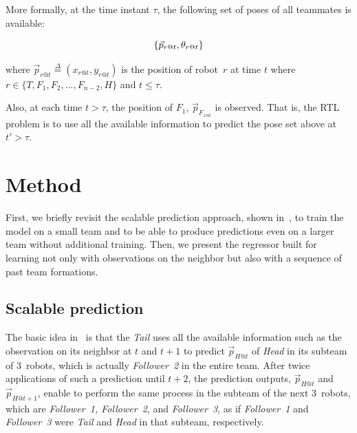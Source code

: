 \documentclass[letterpaper, 10 pt, conference]{ieeeconf}  %
\begin{document}
	More formally, at the time instant $\tau$, the following set of poses of all teammates is
	available:

	\begin{equation*}
		\{\vec{p}_{r@t},\theta_{r@t}\} \\
	\label{eq:pose_set}
	\end{equation*}

	where $\vec{p}_{r@t} \overset{\Delta}{=}(x_{r@t}, y_{r@t})$ is the position of robot~$r$
	at time $t$
	where  $r \in \{T, F_{1}, F_{2}, ..., F_{n-2}, H\}$ and $t \leq \tau$.

	Also, at each time $t > \tau$, the position of $F_1$, $\vec{p}_{F_{1@t}}$ is observed.
	That is, the RTL problem is to use all the available information to predict
	the pose set above at $t' > \tau$.



	\section{Method}
	\label{sec:method}

	First, we briefly revisit the scalable prediction approach, shown in~\cite{CPR17},
	to train the model on a small team and to be able to produce predictions
	even on a larger team without additional training.
	Then, we present the regressor built for learning not only with observations on
	the neighbor but also with a sequence of past team formations.


	\subsection{Scalable prediction}
	\label{sec:scalable_prediction}

	The basic idea in~\cite{CPR17} is that the \emph{Tail} uses all the available information
	such as the observation on its neighbor
	at $t$ and $t+1$ to predict $\vec{p}_{H@t}$ of \emph{Head} in its subteam of $3$~robots,
	which is actually \emph{Follower~2} in the entire team.
	After twice applications of such a prediction until $t+2$, the prediction outputs,
	$\vec{p}_{H@t}$ and $\vec{p}_{H@t+1}$, enable
	to perform the same process in the subteam of the next $3$~robots, which are
	\emph{Follower~1, Follower~2}, and \emph{Follower~3}, as if \emph{Follower~1} and
	\emph{Follower~3} were \emph{Tail} and \emph{Head} in that subteam, respectively.
\end{document}
